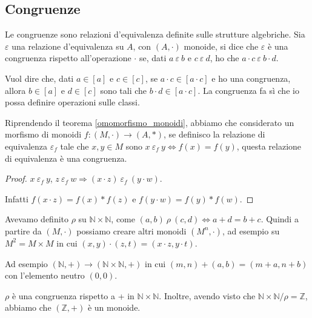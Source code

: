 \subsection{Congruenze\label{congruenze}}

\begin{defn}
Le congruenze sono relazioni d'equivalenza definite sulle strutture algebriche. Sia $\varepsilon$ una relazione d'equivalenza su $A$, con $(A, \cdot)$ monoide, si dice che $\varepsilon$ \`e una congruenza rispetto all'operazione $\cdot$ se, dati $a \ \varepsilon \ b$ e $c \ \varepsilon \ d$, ho che $a \cdot c \ \varepsilon \ b \cdot d$.
\end{defn}

Vuol dire che, dati $a \in [a]$ e $c \in [c]$, se $a \cdot c \in [a \cdot c]$ e ho una congruenza, allora $b \in [a]$ e $d \in [c]$ sono tali che $b \cdot d \in [a \cdot c]$. La congruenza fa s\`i che io possa definire operazioni sulle classi.

\begin{prop}
Riprendendo il teorema \ref{omomorfismo_monoidi}, abbiamo che considerato un morfismo di monoidi $f : (M, \cdot) \to (A, \ast)$, se definisco la relazione di equivalenza $\varepsilon_f$ tale che $x, y \in M$ sono $x \ \varepsilon_f \ y \Leftrightarrow f(x) = f(y)$, questa relazione di equivalenza \`e una congruenza.
\end{prop}
\begin{proof}\label{congruenza_monoidi}
$x \ \varepsilon_f \ y$, $z \ \varepsilon_f \ w \Rightarrow (x \cdot z) \ \varepsilon_f \ (y \cdot w)$.

Infatti $f(x \cdot z) = f(x) \ast f(z)$ e $f(y \cdot w) = f(y) \ast f(w)$. 
\end{proof}

Avevamo definito $\rho$ su $\mathbb{N} \times \mathbb{N}$, come $(a, b) \ \rho \ (c, d) \Leftrightarrow a+d = b+c$. Quindi a partire da $(M, \cdot) $ possiamo creare altri monoidi $(M^n, \cdot)$, ad esempio su $M^2 = M \times M$ in cui $(x, y) \cdot (z, t) = (x \cdot z, y \cdot t)$.

Ad esempio $(\mathbb{N}, +) \to (\mathbb{N} \times \mathbb{N}, +)$ in cui $(m, n) + (a, b) = (m+a, n+b)$ con l'elemento neutro $(0,0)$.

$\rho$ \`e una congruenza rispetto a + in $\mathbb{N} \times \mathbb{N}$. Inoltre, avendo visto che $\mathbb{N} \times \mathbb{N} / \rho = \mathbb{Z}$, abbiamo che $(\mathbb{Z}, +)$ \`e un monoide.


